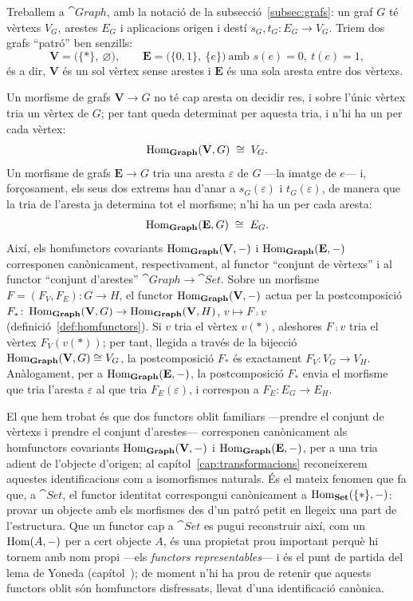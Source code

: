 \begin{exemple}\label{ex:homfunctor-grafs}
Treballem a $\cat{Graph}$, amb la notació de la subsecció~\ref{subsec:grafs}: un graf $G$ té vèrtexs $V_G$, arestes $E_G$ i aplicacions origen i destí $s_G,t_G\colon E_G\to V_G$. Triem dos grafs \enquote{patró} ben senzills:
\[
\mathbf V=\bigl(\{\ast\},\ \varnothing\bigr),
\qquad
\mathbf E=\bigl(\{0,1\},\ \{e\}\bigr)\ \text{amb } s(e)=0,\ t(e)=1,
\]
és a dir, $\mathbf V$ és un sol vèrtex sense arestes i $\mathbf E$ és una sola aresta entre dos vèrtexs.

Un morfisme de grafs $\mathbf V\to G$ no té cap aresta on decidir res, i sobre l'únic vèrtex tria un vèrtex de $G$; per tant queda determinat per aquesta tria, i n'hi ha un per cada vèrtex:
\[
\operatorname{Hom}_{\mathbf{Graph}}(\mathbf V,G)\;\cong\;V_G.
\]
Un morfisme de grafs $\mathbf E\to G$ tria una aresta $\varepsilon$ de $G$ ---la imatge de $e$--- i, forçosament, els seus dos extrems han d'anar a $s_G(\varepsilon)$ i $t_G(\varepsilon)$, de manera que la tria de l'aresta ja determina tot el morfisme; n'hi ha un per cada aresta:
\[
\operatorname{Hom}_{\mathbf{Graph}}(\mathbf E,G)\;\cong\;E_G.
\]
Així, els homfunctors covariants $\operatorname{Hom}_{\mathbf{Graph}}(\mathbf V,-)$ i $\operatorname{Hom}_{\mathbf{Graph}}(\mathbf E,-)$ corresponen canònicament, respectivament, al functor \enquote{conjunt de vèrtexs} i al functor \enquote{conjunt d'arestes} $\cat{Graph}\to\cat{Set}$. Sobre un morfisme $F=(F_V,F_E)\colon G\to H$, el functor $\operatorname{Hom}_{\mathbf{Graph}}(\mathbf V,-)$ actua per la postcomposició $F_*\colon\operatorname{Hom}_{\mathbf{Graph}}(\mathbf V,G)\to\operatorname{Hom}_{\mathbf{Graph}}(\mathbf V,H)$, $v\mapsto F\comp v$ (definició~\ref{def:homfunctors}). Si $v$ tria el vèrtex $v(\ast)$, aleshores $F\comp v$ tria el vèrtex $F_V(v(\ast))$; per tant, llegida a través de la bijecció $\operatorname{Hom}_{\mathbf{Graph}}(\mathbf V,G)\cong V_G$, la postcomposició $F_*$ és exactament $F_V\colon V_G\to V_H$. Anàlogament, per a $\operatorname{Hom}_{\mathbf{Graph}}(\mathbf E,-)$, la postcomposició $F_*$ envia el morfisme que tria l'aresta $\varepsilon$ al que tria $F_E(\varepsilon)$, i correspon a $F_E\colon E_G\to E_H$.

El que hem trobat és que dos functors oblit familiars ---prendre el conjunt de vèrtexs i prendre el conjunt d'arestes--- corresponen canònicament als homfunctors covariants $\operatorname{Hom}_{\mathbf{Graph}}(\mathbf V,-)$ i $\operatorname{Hom}_{\mathbf{Graph}}(\mathbf E,-)$, per a una tria adient de l'objecte d'origen; al capítol~\ref{cap:transformacions} reconeixerem aquestes identificacions com a isomorfismes naturals. És el mateix fenomen que fa que, a $\cat{Set}$, el functor identitat correspongui canònicament a $\operatorname{Hom}_{\mathbf{Set}}(\{\ast\},-)$: provar un objecte amb els morfismes des d'un patró petit en llegeix una part de l'estructura. Que un functor cap a $\cat{Set}$ es pugui reconstruir així, com un $\operatorname{Hom}(A,-)$ per a cert objecte $A$, és una propietat prou important perquè hi tornem amb nom propi ---els \emph{functors representables}--- i és el punt de partida del lema de Yoneda (capítol~); de moment n'hi ha prou de retenir que aquests functors oblit són homfunctors disfressats, llevat d'una identificació canònica.
\end{exemple}

